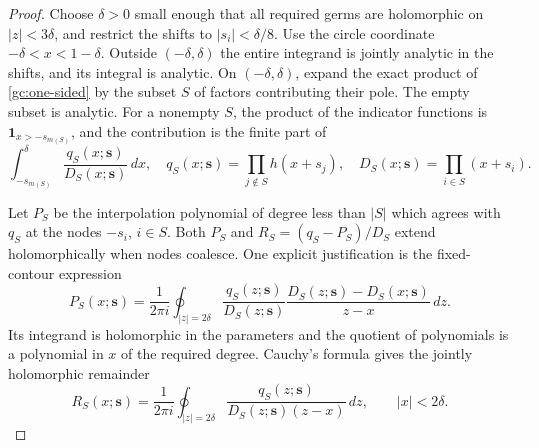 \documentclass[11pt]{article}
\numberwithin{equation}{section}
\theoremstyle{definition}
\theoremstyle{remark}
\begin{document}
\begin{proof}
Choose $\delta>0$ small enough that all required germs are holomorphic on
$|z|<3\delta$, and restrict the shifts to $|s_i|<\delta/8$.  Use the circle
coordinate $-\delta<x<1-\delta$.  Outside $(-\delta,\delta)$ the entire
integrand is jointly analytic in the shifts, and its integral is analytic.
On $(-\delta,\delta)$, expand the exact product of
\eqref{gc:one-sided} by the subset $S$ of factors contributing their pole.
The empty subset is analytic.  For a nonempty $S$, the product of the
indicator functions is $\boldsymbol{1}_{x>-s_{m(S)}}$, and the contribution
is the finite part of
\begin{equation}\label{gc:subset-integral}
 \int_{-s_{m(S)}}^\delta \frac{q_S(x;\boldsymbol{s})}
                                      {D_S(x;\boldsymbol{s})}\,dx,
 \quad
 q_S(x;\boldsymbol{s})=\prod_{j\notin S}h(x+s_j),
 \quad D_S(x;\boldsymbol{s})=\prod_{i\in S}(x+s_i).
\end{equation}

Let $P_S$ be the interpolation polynomial of degree less than $|S|$ which
agrees with $q_S$ at the nodes $-s_i$, $i\in S$.  Both $P_S$ and
$R_S=(q_S-P_S)/D_S$ extend holomorphically when nodes coalesce.  One
explicit justification is the fixed-contour expression
\begin{equation}\label{gc:hermite}
 P_S(x;\boldsymbol{s})=\frac1{2\pi i}\oint_{|z|=2\delta}
 \frac{q_S(z;\boldsymbol{s})}{D_S(z;\boldsymbol{s})}
 \frac{D_S(z;\boldsymbol{s})-D_S(x;\boldsymbol{s})}{z-x}\,dz.
\end{equation}
Its integrand is holomorphic in the parameters and the quotient of
polynomials is a polynomial in $x$ of the required degree.  Cauchy's
formula gives the jointly holomorphic remainder
\[
 R_S(x;\boldsymbol{s})=\frac1{2\pi i}\oint_{|z|=2\delta}
 \frac{q_S(z;\boldsymbol{s})}
 {D_S(z;\boldsymbol{s})(z-x)}\,dz,
 \qquad |x|<2\delta.
\]


\end{proof}
\end{document}
